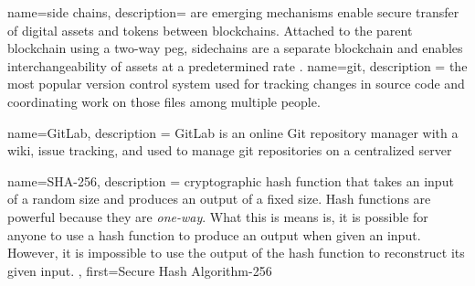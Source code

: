 {
	name={side chains},
	description= {
	are emerging mechanisms enable secure transfer of digital assets and tokens between blockchains. Attached to the parent blockchain using a two-way peg, sidechains are a separate blockchain and enables interchangeability of assets at a predetermined rate \cite{sideChains:Online}. 
	}
}
{
	name={git},
	description ={
			the most popular version control system used for tracking changes in source code and coordinating work on those files among multiple people.
	}
}


{
	name={GitLab},
	description ={
		GitLab is an online Git repository manager with a wiki, issue tracking, and used to manage \gls{git} repositories on a centralized server
	}
}

{
	name={SHA-256},
	description ={
		cryptographic hash function that takes an input of a random size and produces an output of a fixed size. Hash functions are powerful because they are \textit{one-way}. What this is means is, it is possible for anyone to use a hash function to produce an output when given an input. However, it is impossible to use the output of the hash function to reconstruct its given input.
	},
	first={Secure Hash Algorithm-256}
}
